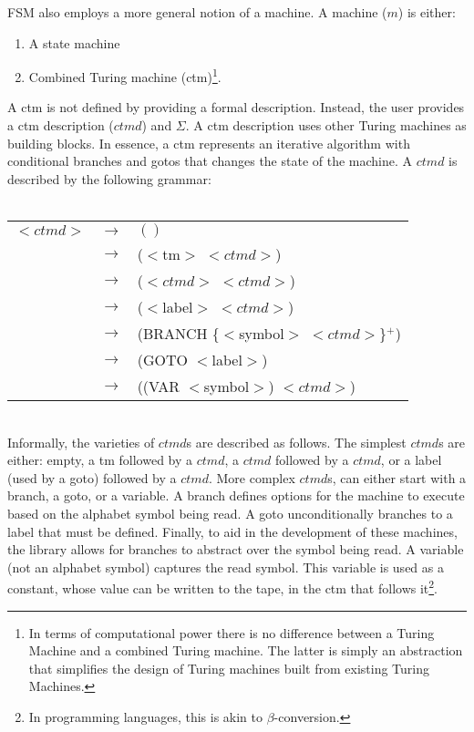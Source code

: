 \documentclass{eptcs}
\begin{document}
\textsf{FSM} also employs a more general notion of a machine. A machine ($\mathit{m}$) is either:
 \begin{enumerate}
   \item A state machine
   \item Combined Turing machine (\textsf{ctm})\footnote{In terms of computational power there is no difference between a Turing Machine and a combined Turing machine. The latter is simply an abstraction that simplifies the design of Turing machines built from existing Turing Machines.}.
 \end{enumerate}
A \textsf{ctm} is not defined by providing a formal description. Instead, the user provides a \textsf{ctm} description ($ctmd$) and $\Sigma$. A \textsf{ctm} description uses other Turing machines as building blocks. In essence, a \textsf{ctm} represents an iterative algorithm with conditional branches and gotos that changes the state of the machine.  A $ctmd$ is described by the following grammar:\\ \\
\begin{centering}
\begin{tabular}{rcl}
$<$$\mathit{ctmd}$$>$ & $\rightarrow$ & $\mathit{()}$ \\
   & $\rightarrow$ & ($<$\textsf{tm}$>$ $<$$\mathit{ctmd}$$>$) \\
   & $\rightarrow$ & ($<$$\mathit{ctmd}$$>$ $<$$\mathit{ctmd}$$>$) \\
   & $\rightarrow$ &  ($<$\textsf{label}$>$ $<$$\mathit{ctmd}$$>$) \\
   & $\rightarrow$ & (\textsf{BRANCH} \{$<$\textsf{symbol}$>$ $<$$\mathit{ctmd}$$>$\}$^+$) \\
   & $\rightarrow$ & (\textsf{GOTO} $<$\textsf{label}$>$) \\
   & $\rightarrow$ & ((\textsf{VAR} $<$symbol$>$) $<$$\mathit{ctmd}$$>$) \\
\end{tabular}
\end{centering}\\

\noindent Informally, the varieties of $\mathit{ctmd}$s are described as follows. The simplest $\mathit{ctmd}$s are either: empty, a \textsf{tm} followed by a $\mathit{ctmd}$, a $\mathit{ctmd}$ followed by a $\mathit{ctmd}$, or a label (used by a goto) followed by a $\mathit{ctmd}$. More complex $\mathit{ctmd}$s, can either start with a branch, a goto, or a variable. A branch defines options for the machine to execute based on the alphabet symbol being read. A goto unconditionally branches to a label that must be defined. Finally, to aid in the development of these machines, the library allows for branches to abstract over the symbol being read. A variable (not an alphabet symbol) captures the read symbol. This variable is used as a constant, whose value  can be written to the tape, in the \textsf{ctm} that follows it\footnote{In programming languages, this is akin to $\beta$-conversion.}.
\end{document}
